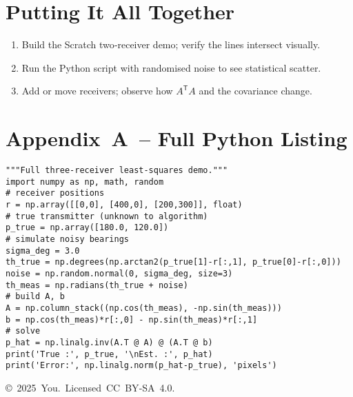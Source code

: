 \documentclass[11pt]{article}
\begin{document}
\section{Putting It All Together}
\begin{enumerate}
  \item Build the Scratch two‑receiver demo; verify the lines intersect visually.
  \item Run the Python script with randomised noise to see statistical scatter.
  \item Add or move receivers; observe how $A^{\mathsf T}A$ and the covariance change.
\end{enumerate}

\section*{Appendix A – Full Python Listing}
\begin{verbatim}
"""Full three‑receiver least‑squares demo."""
import numpy as np, math, random
# receiver positions
r = np.array([[0,0], [400,0], [200,300]], float)
# true transmitter (unknown to algorithm)
p_true = np.array([180.0, 120.0])
# simulate noisy bearings
sigma_deg = 3.0
th_true = np.degrees(np.arctan2(p_true[1]-r[:,1], p_true[0]-r[:,0]))
noise = np.random.normal(0, sigma_deg, size=3)
th_meas = np.radians(th_true + noise)
# build A, b
A = np.column_stack((np.cos(th_meas), -np.sin(th_meas)))
b = np.cos(th_meas)*r[:,0] - np.sin(th_meas)*r[:,1]
# solve
p_hat = np.linalg.inv(A.T @ A) @ (A.T @ b)
print('True :', p_true, '\nEst. :', p_hat)
print('Error:', np.linalg.norm(p_hat-p_true), 'pixels')
\end{verbatim}

\vfill\noindent\small© 2025 You. Licensed CC BY‑SA 4.0.
\end{document}
